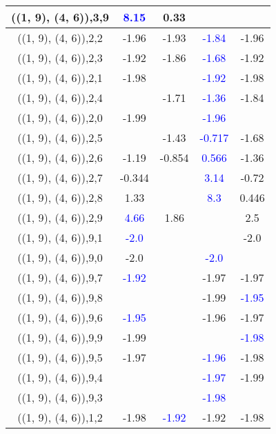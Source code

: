 \documentclass{article}
\begin{document}
\begin{center}
\begin{longtable}{|c|c|c|c|c|}
        	\hline
        	((1, 9), (4, 6)),3,9& \textcolor{blue}{8.15}&0.33&&\\
        	\hline
        	((1, 9), (4, 6)),2,2&-1.96&-1.93& \textcolor{blue}{-1.84}&-1.96\\
        	\hline
        	((1, 9), (4, 6)),2,3&-1.92&-1.86& \textcolor{blue}{-1.68}&-1.92\\
        	\hline
        	((1, 9), (4, 6)),2,1&-1.98&& \textcolor{blue}{-1.92}&-1.98\\
        	\hline
        	((1, 9), (4, 6)),2,4&&-1.71& \textcolor{blue}{-1.36}&-1.84\\
        	\hline
        	((1, 9), (4, 6)),2,0&-1.99&& \textcolor{blue}{-1.96}&\\
        	\hline
        	((1, 9), (4, 6)),2,5&&-1.43& \textcolor{blue}{-0.717}&-1.68\\
        	\hline
        	((1, 9), (4, 6)),2,6&-1.19&-0.854& \textcolor{blue}{0.566}&-1.36\\
        	\hline
        	((1, 9), (4, 6)),2,7&-0.344&& \textcolor{blue}{3.14}&-0.72\\
        	\hline
        	((1, 9), (4, 6)),2,8&1.33&& \textcolor{blue}{8.3}&0.446\\
        	\hline
        	((1, 9), (4, 6)),2,9& \textcolor{blue}{4.66}&1.86&&2.5\\
        	\hline
        	((1, 9), (4, 6)),9,1& \textcolor{blue}{-2.0}&&&-2.0\\
        	\hline
        	((1, 9), (4, 6)),9,0&-2.0&& \textcolor{blue}{-2.0}&\\
        	\hline
        	((1, 9), (4, 6)),9,7& \textcolor{blue}{-1.92}&&-1.97&-1.97\\
        	\hline
        	((1, 9), (4, 6)),9,8&&&-1.99& \textcolor{blue}{-1.95}\\
        	\hline
        	((1, 9), (4, 6)),9,6& \textcolor{blue}{-1.95}&&-1.96&-1.97\\
        	\hline
        	((1, 9), (4, 6)),9,9&-1.99&&& \textcolor{blue}{-1.98}\\
        	\hline
        	((1, 9), (4, 6)),9,5&-1.97&& \textcolor{blue}{-1.96}&-1.98\\
        	\hline
        	((1, 9), (4, 6)),9,4&&& \textcolor{blue}{-1.97}&-1.99\\
        	\hline
        	((1, 9), (4, 6)),9,3&&& \textcolor{blue}{-1.98}&\\
        	\hline
        	((1, 9), (4, 6)),1,2&-1.98& \textcolor{blue}{-1.92}&-1.92&-1.98\\

\end{longtable}
\end{center}
\end{document}
